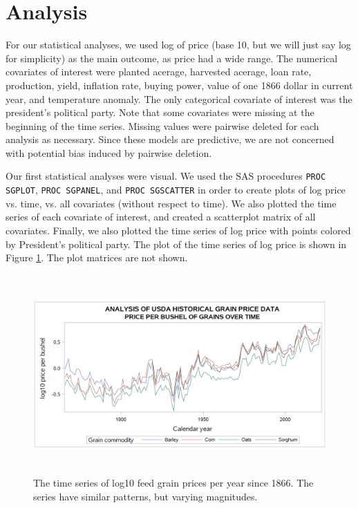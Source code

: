 \documentclass[11pt]{article}
\begin{document}
\section*{Analysis}

For our statistical analyses, we used log of price (base 10,
but we will just say log for simplicity) as the main outcome, as price had a
wide range. The numerical  covariates of interest were planted acerage,
harvested acerage, loan rate,  production, yield, inflation rate, buying power,
value of one 1866 dollar in  current year, and temperature anomaly. The only
categorical covariate of interest was the president's political party. Note
that some covariates were missing at the beginning of the time series. Missing
values were pairwise deleted for each analysis as necessary. Since these models
are predictive, we are not concerned with potential bias induced by pairwise
deletion.

Our first statistical analyses were visual. We used the SAS procedures
\texttt{PROC SGPLOT}, \texttt{PROC SGPANEL}, and
\texttt{PROC SGSCATTER} in order to create plots of log price vs. time, vs. all
covariates (without respect to time). We also plotted the time series of each
covariate of interest, and created a scatterplot matrix of all covariates.
Finally, we also plotted the time series of log price with points colored by
President's political party. The plot of the time series of log price is shown
in Figure \ref{fig:timeseries}. The plot matrices are not shown.

\begin{figure}[!ht]
	\centering
	\includegraphics[height=3in]{../figs/timeseries.png}
	\caption{The time series of log10 feed grain prices per year since 1866.
	The series have similar patterns, but varying magnitudes.}
	\label{fig:timeseries}
\end{figure}
\end{document}
